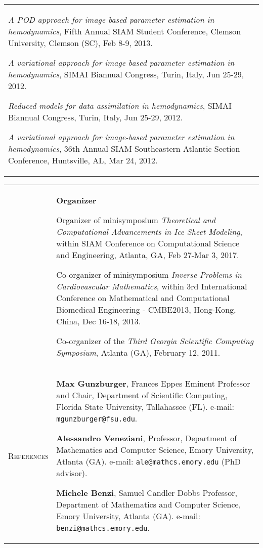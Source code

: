 \documentclass[10pt]{article}
\begin{document}
\begin{tabular}{p{2.5cm}|p{15.5cm}}
\vspace*{0.2cm}
\textit{A POD approach for image-based parameter estimation in hemodynamics}, Fifth Annual SIAM Student Conference, Clemson University, Clemson (SC), Feb 8-9, 2013.

\vspace*{0.2cm}
\textit{A variational approach for image-based parameter estimation in hemodynamics}, SIMAI Biannual Congress, Turin, Italy, Jun 25-29, 2012.

\vspace*{0.2cm}
\textit{Reduced models for data assimilation in hemodynamics}, SIMAI Biannual Congress, Turin, Italy, Jun 25-29, 2012.

\vspace*{0.2cm}
\textit{A variational approach for image-based parameter estimation in hemodynamics}, 36th Annual SIAM Southeastern Atlantic Section Conference, Huntsville, AL, Mar 24, 2012.
\end{tabular}

\begin{tabular}{p{2.5cm}|p{15.5cm}}

&
\textbf{Organizer}

\vspace*{0.1cm}
Organizer of minisymposium \textit{Theoretical and Computational Advancements in Ice Sheet Modeling}, within SIAM Conference on Computational Science and Engineering, Atlanta, GA, Feb 27-Mar 3, 2017.

\vspace*{0.2cm}
Co-organizer of minisymposium \textit{Inverse Problems in Cardiovascular Mathematics}, within 3rd International Conference on Mathematical and Computational Biomedical Engineering - CMBE2013, Hong-Kong, China, Dec 16-18, 2013.

\vspace*{0.2cm}
Co-organizer of the \textit{Third Georgia Scientific Computing Symposium}, Atlanta (GA), February 12, 2011.
\vspace*{0.2cm}
\\
\textsc{References} & \textbf{Max Gunzburger}, Frances Eppes Eminent Professor and Chair, Department of Scientific Computing, Florida State University, Tallahassee (FL). e-mail: \verb|mgunzburger@fsu.edu|.

\vspace*{0.1cm}
\textbf{Alessandro Veneziani}, Professor, Department of Mathematics and Computer Science, Emory University, Atlanta (GA). e-mail: \verb|ale@mathcs.emory.edu| (PhD advisor).

\vspace*{0.1cm}
\textbf{Michele Benzi}, Samuel Candler Dobbs Professor, Department of Mathematics and Computer Science, Emory University, Atlanta (GA). e-mail: \verb|benzi@mathcs.emory.edu|.
\end{tabular}
\end{document}
